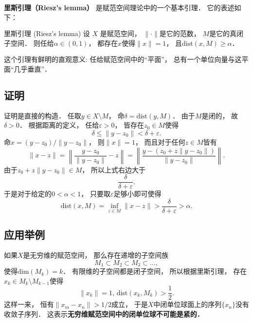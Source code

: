 
\begin{issues}
\issueNeedCite
\end{issues}


\textbf{里斯引理（Riesz's lemma）} 是赋范空间理论中的一个基本引理． 它的表述如下：

\begin{lemma}{里斯引理 (Riesz's lemma)}
设 $X$ 是赋范空间， $\|\cdot\|$是它的范数， $M$是它的真闭子空间． 则任给$\alpha\in(0,1)$， 都存在$x$使得$\|x\|=1$， 且$\text{dist}(x,M)\geq\alpha$．
\end{lemma}

这个引理有鲜明的直观意义: 任给赋范空间中的“平面”， 总有一个单位向量与这平面“几乎垂直”．

\subsection{证明}
证明是直接的构造． 任取$y\in X\setminus M$， 命$\delta=\text{dist}(y,M)$． 由于$M$是闭的， 故$\delta>0$． 根据距离的定义， 任给$\varepsilon>0$， 皆存在$z_0\in M$使得
$$
\delta\leq \|y-z_0\|<\delta+\varepsilon.
$$
命$x=(y-z_0)/\|y-z_0\|$， 则$\|x\|=1$， 而且对于任何$z\in M$皆有
$$
\|x-z\|
=\left\|\frac{y-z_0}{\|y-z_0\|}-z\right\|
=\left\|\frac{y-(z_0+z\|y-z_0\|)}{\|y-z_0\|}\right\|.
$$
由于$z_0+z\|y-z_0\|\in M$， 所以上式右边大于
$$
\frac{\delta}{\delta+\varepsilon}.
$$
于是对于给定的$0<\alpha<1$， 只要取$\varepsilon$足够小即可使得
$$
\text{dist}(x,M)
=\inf_{z\in M}\|x-z\|
>\frac{\delta}{\delta+\varepsilon}
>\alpha.
$$

\subsection{应用举例}
如果$X$是无穷维的赋范空间， 那么存在递增的子空间族
$$
M_1\subset M_2\subset M_3\subset...,
$$
使得$\text{dim}(M_k)=k$． 有限维的子空间都是闭子空间， 所以根据里斯引理， 存在$x_k\in M_k\setminus M_{k-1}$使得
$$
\|x_k\|=1,\,\text{dist}(x_k,M_k)>\frac{1}{2}.
$$
这样一来， 恒有$\|x_m-x_n\|>1/2$成立， 于是$X$中闭单位球面上的序列$\{x_n\}$没有收敛子序列． 这表示\textbf{无穷维赋范空间中的闭单位球不可能是紧的．}